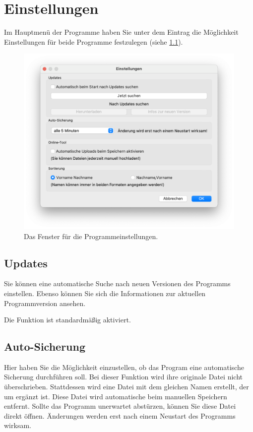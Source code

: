 \chapter{Einstellungen}\label{epl:allg:einstellungen}
Im Hauptmenü der Programme haben Sie unter dem Eintrag 
die Möglichkeit Einstellungen für beide Programme festzulegen
(siehe \cref{fig:einstellungen}).
\begin{figure}[!h]
  \centering
	\includegraphics[width=.75\textwidth]{img/einstellungen}
	\caption{Das Fenster für die Programmeinstellungen.}
	\label{fig:einstellungen}
\end{figure}



\section{Updates}
Sie können eine automatische Suche nach neuen Versionen des Programms einstellen.
Ebenso können Sie sich die Informationen zur aktuellen Programmversion ansehen.

Die Funktion ist standardmäßig aktiviert.



\section{Auto-Sicherung}
Hier haben Sie die Möglichkeit einzustellen, ob das Program eine automatische Sicherung durchführen soll.
Bei dieser Funktion wird ihre originale Datei nicht überschrieben.
Stattdessen wird eine Datei mit dem gleichen Namen erstellt, der um  ergänzt ist.
Diese Datei wird automatische beim manuellen Speichern entfernt.
Sollte das Programm unerwartet abstürzen, können Sie diese Datei direkt öffnen.
Änderungen werden erst nach einem Neustart des Programms wirksam.

